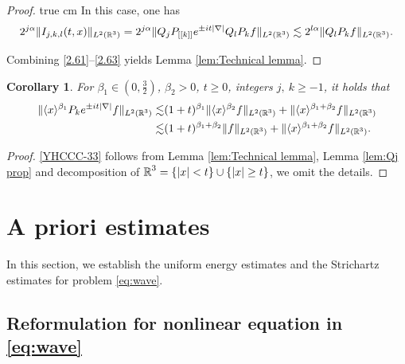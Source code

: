 \documentclass[11pt,twoside]{article}
\def\R{\mathop{\mathbb R\kern 0pt}\nolimits}
\def\f{\frac}
\def\ls{\lesssim}
\newcommand{\w}[1]{\langle {#1} \rangle}
\theoremstyle{plain}
\newtheorem{cor}[theorem]{Corollary}
\theoremstyle{definition}
\numberwithin{equation}{section}
\begin{document}
\begin{proof}
 true cm
		In this case, one has
		\begin{equation}\label{2.63}
			2^{j\alpha}\|I_{j,k,l}(t,x)\|_{L^2(\R^3)}=	2^{j\alpha}\|Q_jP_{[[k]]} e^{\pm it|\nabla|} Q_lP_kf\|_{L^2(\R^3)}
			\ls 2^{l\alpha }\|Q_lP_kf\|_{L^2(\R^3)}.
		\end{equation}

		Combining \eqref{2.61}--\eqref{2.63} yields Lemma \ref{lem:Technical lemma}.
	\end{proof}
	\begin{cor}\label{cor:Technical lemma}
		For $\beta_1\in(0,\f32)$, $\beta_2>0$, $t\ge 0 $, integers $j,\ k\ge -1$, it holds that
		\begin{equation}\label{YHCCC-33}
			\begin{split}
				\|\w{x}^{\beta_1}P_k e^{\pm it|\nabla|}f\|_{L^2(\R^3)}
				\ls&
				(1+t)^{\beta_1}\|\w{x}^{\beta_2} f\|_{L^2(\R^3)}
				+
				\|\w{x}^{\beta_1+\beta_2 } f\|_{L^2(\R^3)}\\
				\ls&
				(1+t)^{\beta_1+\beta_2 }\|f\|_{L^2(\R^3)}
				+
				\|\w{x}^{\beta_1+\beta_2 } f\|_{L^2(\R^3)}.
			\end{split}
		\end{equation}
	\end{cor}
	\begin{proof}
		\eqref{YHCCC-33} follows from Lemma \ref{lem:Technical lemma}, Lemma \ref{lem:Qj prop} and decomposition of
$\R^3=\{|x|<t\}\cup\{|x|\ge t\}$, we omit the details.
	\end{proof}



\section{A priori estimates}\label{Section 4}
In this section, we establish the uniform energy estimates and the Strichartz estimates for problem \eqref{eq:wave}.


\subsection{Reformulation for nonlinear equation in \eqref{eq:wave}}
\end{document}
